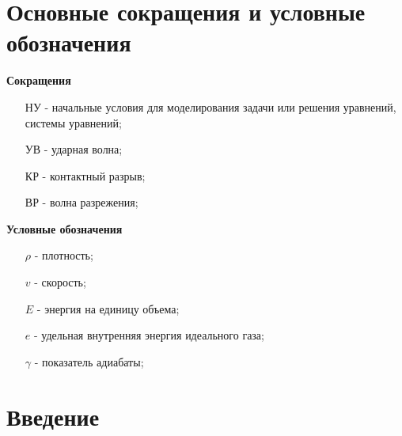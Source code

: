 


%

\usepackage{titlesec}
\titleformat{\part}[display]
{\huge\bfseries\centering}{\partname~\thepart}{0pt}{}
\titlespacing*{\part}{0pt}{40pt}{40pt}


 

\newpage
 
\hypersetup{linkcolor=black}
\tableofcontents

\newpage
\part*{Основные сокращения и условные обозначения}

\textbf{Сокращения}
\begin{itemize}
\item[НУ] - начальные условия для моделирования задачи или решения уравнений, системы уравнений;
\item[УВ] - ударная волна;
\item[КР] - контактный разрыв;
\item[ВР] - волна разрежения;
\end{itemize}

\textbf{Условные обозначения}
\begin{itemize}
\item [$\rho$] - плотность;
\item [$v$] - скорость;
\item [$E$] - энергия на единицу объема;
\item [$e$] - удельная внутренняя энергия идеального газа;
\item [$\gamma$] - показатель адиабаты;
\end{itemize}
 
\newpage
\part*{Введение}\label{part_intro}

